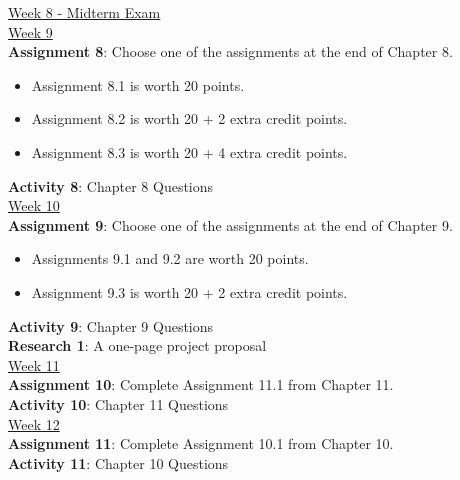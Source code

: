 \documentclass[11pt]{article}
\begin{document}
\underline {Week 8 - Midterm Exam} \\

\underline {Week 9} \\
\textbf {Assignment 8}: Choose one of the assignments at the end of Chapter 8.
\begin{itemize} \itemsep -1.5em
	\item Assignment 8.1 is worth 20 points. \\
	\item Assignment 8.2 is worth 20 + 2 extra credit points. \\
	\item Assignment 8.3 is worth 20 + 4 extra credit points.
\end{itemize}

\textbf {Activity 8}: Chapter 8 Questions \\

\underline {Week 10} \\
\textbf {Assignment 9}: Choose one of the assignments at the end of Chapter 9.
\begin{itemize} \itemsep -1.5em
	\item Assignments 9.1 and 9.2 are worth 20 points. \\
	\item Assignment 9.3 is worth 20 + 2 extra credit points.
\end{itemize}

\textbf {Activity 9}: Chapter 9 Questions \\
\textbf {Research 1}: A one-page project proposal \\

\underline {Week 11} \\
\textbf {Assignment 10}: Complete Assignment 11.1 from Chapter 11. \\
\textbf {Activity 10}: Chapter 11 Questions \\

\underline {Week 12} \\
\textbf {Assignment 11}: Complete Assignment 10.1 from Chapter 10. \\
\textbf {Activity 11}: Chapter 10 Questions
\end{document}
